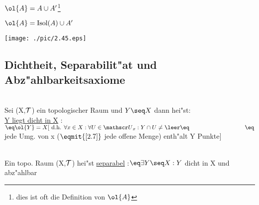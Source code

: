 \begin{prop}\label{2.44}{$\ol{A}=A\cup A'$\footnote{dies ist oft die Definition von $\ol{A}$}}
\end{prop}

\begin{lemma}\label{2.45}{$\ol{A}=\isol{A}\cup A'$}
\end{lemma}
\texttt{[image: ./pic/2.45.eps]}

\subsection{Dichtheit, Separabilit"at und Abz"ahlbarkeitsaxiome}

\begin{definition}\label{2.46}\\
Sei (X,$\mathcal T$) ein topologischer Raum und $Y\seq X$ dann hei"st:\\
\ul{Y liegt dicht in X} :$\eq \ol{Y} = X[\mbox{ d.h. } \forall x\in X:\forall U\in \umg{U}{x}: Y\cap U \neq \leer\eq \\
\hspace*{3.3cm} \eq $jede Umg. von x ($\eqmit{\ref{2.7}}$ jede offene Menge) enth"alt Y Punkte$]$
\end{definition}

\begin{definition}\label{2.47}\\
Ein topo. Raum (X,$\mathcal T$) hei"st \ul{separabel} :$\eq\exists Y\seq X: Y$ dicht in X und abz"ahlbar
\end{definition}

